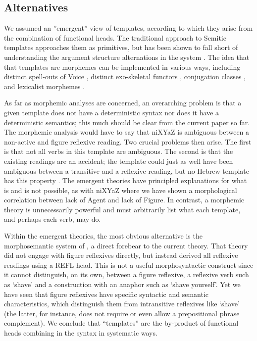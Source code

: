 	\subsection{Alternatives}
We assumed an ''emergent'' view of templates, according to which they arise from the combination of functional heads. The traditional approach to Semitic templates approaches them as primitives, but has been shown to fall short of understanding the argument structure alternations in the system \citep{doron03,kastner16phd,kastner17gjgl,kastner18}. The idea that that templates are morphemes can be implemented in various ways, including distinct spell-outs of Voice \citep{arad05}, distinct exo-skeletal functors \citep{borer13oup}, conjugation classes \citep{aronoff07}, and lexicalist morphemes \citep{reinhartsiloni05,laks11,laks14}.

As far as morphemic analyses are concerned, an overarching problem is that a given template does not have a deterministic syntax nor does it have a deterministic semantics; this much should be clear from the current paper so far. The morphemic analysis would have to say that niXYaZ is ambiguous between a non-active and figure reflexive reading. Two crucial problems then arise. The first is that not all verbs in this template are ambiguous. The second is that the existing readings are an accident; the template could just as well have been ambiguous between a transitive and a reflexive reading, but no Hebrew template has this property \citep{doron05,kastner16phd}. The emergent theories have principled explanations for what is and is not possible, as with niXYaZ where we have shown a morphological correlation between lack of Agent and lack of Figure. In contrast, a morphemic theory is unnecessarily powerful and must arbitrarily list what each template, and perhaps each verb, may do.

Within the emergent theories, the most obvious alternative is the morphosemantic system of \cite{doron03}, a direct forebear to the current theory. That theory did not engage with figure reflexives directly, but instead derived all reflexive readings using a REFL head. This is not a useful morphosyntactic construct since it cannot distinguish, on its own, between a figure reflexive, a reflexive verb such as ‘shave’ and a construction with an anaphor such as ‘shave yourself’. Yet we have seen that figure reflexives have specific syntactic and semantic characteristics, which distinguish them from intransitive reflexives like ‘shave’ (the latter, for instance, does not require or even allow a prepositional phrase complement). We conclude that “templates” are the by-product of functional heads combining in the syntax in systematic ways.


